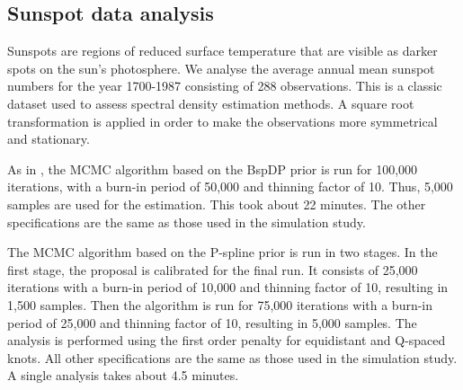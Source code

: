 \documentclass[twocolumn,final]{svjour3}
\begin{document}
\subsection{Sunspot data analysis}
Sunspots are regions of reduced surface temperature that are visible as darker spots on the sun's photosphere.
We analyse the average annual mean sunspot numbers for the year 1700-1987 consisting of  288 observations.  This is a classic dataset used to assess spectral density estimation methods.  A square root transformation is applied in order to make the observations more symmetrical and stationary. 

As in \cite{Edwards2019}, the MCMC algorithm based on the BspDP prior  is run for 100,000 iterations, with a burn-in period of 50,000 and thinning factor of 10.  Thus, 5,000 samples are used for the estimation.  This took about 22 minutes.  The other specifications are the same as those used in the simulation study.

The MCMC algorithm based on the P-spline prior is run in two stages.  In  the first stage, the proposal  is calibrated for the final run.  It consists of 25,000 iterations with a burn-in period of 10,000 and thinning factor of 10, resulting in 1,500 samples.  Then the algorithm is run for 75,000 iterations with a burn-in period of 25,000 and thinning factor of 10, resulting in 5,000 samples.  The analysis is performed using the first order penalty for equidistant and Q-spaced knots.   All other specifications are the same as those used in the simulation study.  A single analysis takes about 4.5 minutes.
\end{document}
